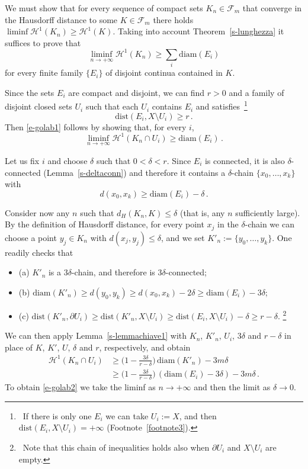 \documentclass[11pt,reqno,a4paper,final]{amsart}
\makeatletter
\numberwithin{equation}{section}
\theoremstyle{mytheorem}
\theoremstyle{myremark}
\theoremstyle{myparagraph}
\renewenvironment{proof}[1][\proofname]{\par 
  \pushQED{\qed}%
  \normalfont \topsep10\p@\@plus6\p@\relax 
  \trivlist 
  \item[\hskip\labelsep 
    \bfseries 
    #1\@addpunct{.}]\ignorespaces 
}{%
  \popQED\endtrivlist\@endpefalse 
}
\providecommand{\proofname}{Proof}
\newcommand{\footnoteb}[1]{\footnote{~#1}}
\newenvironment{itemizeb}
{\begin{itemize}\itemsep=2pt\leftskip -5 pt}
{\end{itemize}}
\newcommand{\F}{\mathscr{F}}
\newcommand{\Haus}{\mathscr{H}}
\newcommand{\bd}{\partial}
\newcommand{\diam}{\mathrm{diam}}
\newcommand{\dist}{\mathrm{dist}}
\makeatother
\begin{document}
\begin{proof}[Proof of Theorem~\ref{s-golab}]
We must show that for every sequence of compact sets $K_n\in \F_m$ 
that converge in the Hausdorff distance to some $K\in\F_m$ there holds 
$\liminf\Haus^1(K_n) \ge \Haus^1(K)$.
Taking into account Theorem~\ref{s-lunghezza} it suffices to prove that
%
\begin{equation}
\label{e-golab1}
\liminf_{n\to +\infty} \Haus^1(K_n) 
\ge \sum_i \diam(E_i)
\end{equation}
%
for every finite family $\{E_i\}$ of 
disjoint continua contained in $K$.

Since the sets $E_i$ are compact and disjoint, 
we can find $r>0$ and a family of disjoint closed sets $U_i$ 
such that each $U_i$ contains $E_i$ and satisfies%
%
\,\footnoteb{If there is only one $E_i$ we can take $U_i:=X$, 
and then $\dist(E_i,X\setminus U_i)=+\infty$ (Footnote~\ref{footnote3}).}
%
\begin{equation}
\label{e-2.12}
\dist(E_i,X\setminus U_i) \ge r
\, .
\end{equation}
%
Then \eqref{e-golab1} follows by showing that, for every $i$,
%
\begin{equation}
\label{e-golab2}
\liminf_{n\to +\infty} \Haus^1(K_n\cap U_i) 
\ge \diam(E_i)
\, .
\end{equation}
%

Let us fix $i$ and choose $\delta$ such that $0<\delta<r$. 
Since $E_i$ is connected, it is also $\delta$-connected
(Lemma~\ref{s-deltaconn}) and therefore it contains a 
$\delta$-chain $\{x_0,\dots,x_k\}$ with
\[
d(x_0,x_k) \ge \diam(E_i) - \delta
\, .
\]

Consider now any $n$ such that $d_H(K_n,K) \le \delta$
(that is, any $n$ sufficiently large).
By the definition of Hausdorff distance, for every 
point $x_j$ in the $\delta$-chain we can choose a point 
$y_j\in K_n$ with $d(x_j,y_j)\le\delta$, and we set 
$K'_n:=\{y_0,\dots,y_k\}$.
One readily checks that
%
\begin{itemizeb}
\item[(a)]
$K'_n$ is a $3\delta$-chain, 
and therefore is $3\delta$-connected;
\item[(b)]
$\diam(K'_n) \ge d(y_0,y_k) \ge d(x_0,x_k) -2\delta \ge \diam(E_i)-3\delta$;
\item[(c)]
$\dist(K'_n,\bd U_i) 
\ge \dist(K'_n,X\setminus U_i) 
\ge \dist(E_i,X\setminus U_i) - \delta 
\ge r-\delta$.%
%
\footnoteb{Note that this chain of inequalities holds also
when $\bd U_i$ and $X\setminus U_i$ are empty.}
\end{itemizeb} 
%
We can then apply Lemma~\ref{s-lemmachiave1}
with $K_n$, $K'_n$, $U_i$, $3\delta$ and $r-\delta$ 
in place of $K$, $K'$, $U$, $\delta$ and $r$, 
respectively, and obtain
%
\begin{align*}
\Haus^1(K_n \cap U_i) 
& \ge \Big( 1 - \frac{3\delta}{r-\delta} \Big) \, \diam(K'_n) - 3m\delta \\
& \ge \Big( 1 - \frac{3\delta}{r-\delta} \Big) \, (\diam(E_i)-3\delta) - 3m\delta
  \, .
\end{align*}
%
To obtain \eqref{e-golab2} we take the liminf 
as $n\to+\infty$ and then the limit as $\delta\to 0$.
\end{proof}
\end{document}
